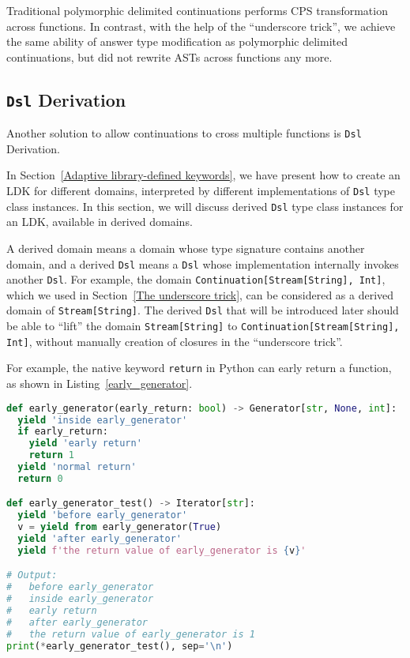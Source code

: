 Traditional polymorphic delimited continuations performs CPS transformation across functions. In contrast, with the help of the ``underscore trick'', we achieve the same ability of answer type modification as polymorphic delimited continuations, but did not rewrite ASTs across functions any more.

\subsection{\lstinline{Dsl} Derivation}\label{Dsl derivation}

Another solution to allow continuations to cross multiple functions is \lstinline{Dsl} Derivation.

In Section~\ref{Adaptive library-defined keywords}, we have present how to create an LDK for different domains, interpreted by different implementations of \lstinline{Dsl} type class instances. In this section, we will discuss derived \lstinline{Dsl} type class instances for an LDK, available in derived domains.

A derived domain means a domain whose type signature contains another domain, and a derived \lstinline{Dsl} means a \lstinline{Dsl} whose implementation internally invokes another \lstinline{Dsl}. For example, the domain \lstinline{Continuation[Stream[String], Int]}, which we used in Section~\ref{The underscore trick}, can be considered as a derived domain of \lstinline{Stream[String]}. The derived \lstinline{Dsl} that will be introduced later should be able to ``lift'' the domain \lstinline{Stream[String]} to \lstinline{Continuation[Stream[String], Int]}, without manually creation of closures in the ``underscore trick''.

For example, the native keyword \lstinline{return} in Python can early return a function, as shown in Listing~\ref{early_generator}.

\begin{lstlisting}[language=Python,style=Python3,caption={Use \lstinline{yield from} and \lstinline{return} in Python generators},label={early_generator}]
def early_generator(early_return: bool) -> Generator[str, None, int]:
  yield 'inside early_generator'
  if early_return:
    yield 'early return'
    return 1
  yield 'normal return'
  return 0

def early_generator_test() -> Iterator[str]:
  yield 'before early_generator'
  v = yield from early_generator(True)
  yield 'after early_generator'
  yield f'the return value of early_generator is {v}'

# Output:
#   before early_generator
#   inside early_generator
#   early return
#   after early_generator
#   the return value of early_generator is 1
print(*early_generator_test(), sep='\n')
\end{lstlisting}

